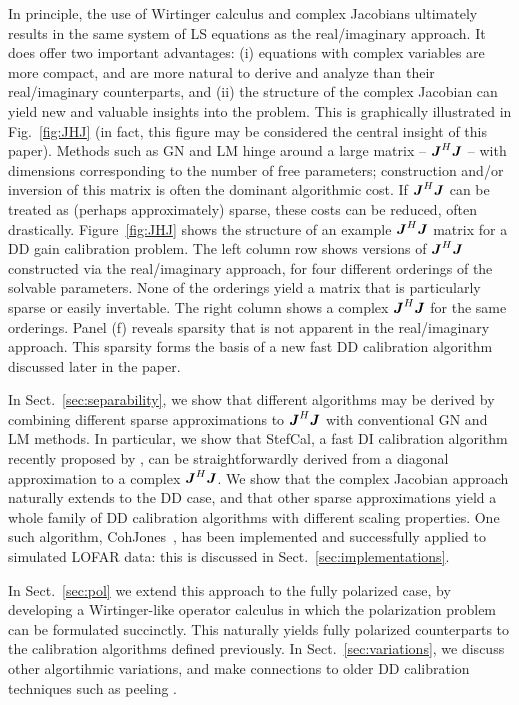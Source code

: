 \documentclass[useAMS,usenatbib]{mn2e}
\newcommand{\mat}[1]{{\bmath{#1}}}
\newcommand{\JJ}{\mat{J}} %
\newcommand{\JHJ}{\JJ^H\JJ} %
\newcommand{\COH}{{\sc CohJones}}
\newcommand{\StefCal}{{\sc StefCal}}
\numberwithin{equation}{section}
\begin{document}
In principle, the use of Wirtinger calculus and complex Jacobians ultimately results in the same system of LS 
equations as the real/imaginary approach. It does offer two important advantages: (i) equations with complex variables 
are more compact, and are more natural to derive and analyze than their real/imaginary counterparts, and (ii) the structure of the
complex Jacobian can yield new and valuable insights into the problem. This is graphically illustrated in 
Fig.~\ref{fig:JHJ} (in fact, this figure may be considered the central insight of this paper). Methods such as 
GN and LM hinge around a large matrix -- $\JHJ$ -- with dimensions corresponding to the number of 
free parameters; construction and/or inversion of this matrix is often the dominant algorithmic cost. If $\JHJ$ can
be treated as (perhaps approximately) sparse, these costs can be reduced, often drastically. Figure~\ref{fig:JHJ} 
shows the structure of an example $\JHJ$ matrix for a DD gain calibration problem. The left column row shows versions of
$\JHJ$ constructed via the real/imaginary approach, for four different orderings of the solvable parameters. None of
the orderings yield a matrix that is particularly sparse or easily invertable. The right column shows a 
complex $\JHJ$ for the same orderings. Panel (f) reveals sparsity that is not apparent in the real/imaginary 
approach. This sparsity forms the basis of a new fast DD calibration algorithm discussed later in the paper.

In Sect.~\ref{sec:separability}, we show that different algorithms may be derived by combining 
different sparse approximations to $\JHJ$ with conventional GN and LM methods.  In particular, we show 
that \StefCal, a fast DI calibration algorithm recently proposed by \citet{Stefcal},
can be straightforwardly derived from a diagonal approximation to a complex $\JHJ$. We show that the 
complex Jacobian approach naturally extends to the DD case, and that other sparse approximations yield a whole family
of DD calibration algorithms with different scaling properties. One such algorithm, \COH\ \citep{Tasse-cohjones}, has been implemented 
and successfully applied to simulated LOFAR data: this is discussed in Sect.~\ref{sec:implementations}.

In Sect.~\ref{sec:pol} we extend this approach to the fully polarized case, by developing a Wirtinger-like 
operator calculus in which the polarization problem can be formulated succinctly. This naturally yields 
fully polarized counterparts to the calibration algorithms defined previously. In Sect.~\ref{sec:variations}, 
we discuss other algortihmic variations, and make connections to older DD calibration techniques such as 
peeling \citep{JEN:peeling}. 
\end{document}
